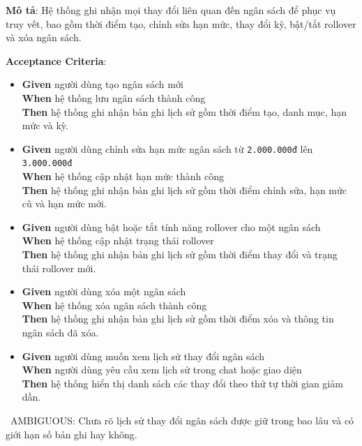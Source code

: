 \textbf{Mô tả}: Hệ thống ghi nhận mọi thay đổi liên quan đến ngân sách để phục vụ truy vết, bao gồm thời điểm tạo, chỉnh sửa hạn mức, thay đổi kỳ, bật/tắt rollover và xóa ngân sách.



\textbf{Acceptance Criteria}:

\begin{itemize}
\item \textbf{Given} người dùng tạo ngân sách mới  \\ \hspace*{1.5em}  \textbf{When} hệ thống lưu ngân sách thành công  \\ \hspace*{1.5em}  \textbf{Then} hệ thống ghi nhận bản ghi lịch sử gồm thời điểm tạo, danh mục, hạn mức và kỳ.
\item \textbf{Given} người dùng chỉnh sửa hạn mức ngân sách từ \texttt{2.000.000đ} lên \texttt{3.000.000đ}  \\ \hspace*{1.5em}  \textbf{When} hệ thống cập nhật hạn mức thành công  \\ \hspace*{1.5em}  \textbf{Then} hệ thống ghi nhận bản ghi lịch sử gồm thời điểm chỉnh sửa, hạn mức cũ và hạn mức mới.
\item \textbf{Given} người dùng bật hoặc tắt tính năng rollover cho một ngân sách  \\ \hspace*{1.5em}  \textbf{When} hệ thống cập nhật trạng thái rollover  \\ \hspace*{1.5em}  \textbf{Then} hệ thống ghi nhận bản ghi lịch sử gồm thời điểm thay đổi và trạng thái rollover mới.
\item \textbf{Given} người dùng xóa một ngân sách  \\ \hspace*{1.5em}  \textbf{When} hệ thống xóa ngân sách thành công  \\ \hspace*{1.5em}  \textbf{Then} hệ thống ghi nhận bản ghi lịch sử gồm thời điểm xóa và thông tin ngân sách đã xóa.
\item \textbf{Given} người dùng muốn xem lịch sử thay đổi ngân sách  \\ \hspace*{1.5em}  \textbf{When} người dùng yêu cầu xem lịch sử trong chat hoặc giao diện  \\ \hspace*{1.5em}  \textbf{Then} hệ thống hiển thị danh sách các thay đổi theo thứ tự thời gian giảm dần.
\end{itemize}
\warningicon\  AMBIGUOUS: Chưa rõ lịch sử thay đổi ngân sách được giữ trong bao lâu và có giới hạn số bản ghi hay không.



